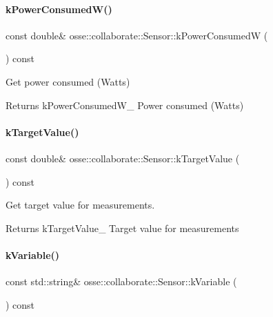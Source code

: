 \paragraph{\texorpdfstring{k\+Power\+Consumed\+W()}{kPowerConsumedW()}}
{\footnotesize\ttfamily const double\& osse\+::collaborate\+::\+Sensor\+::k\+Power\+ConsumedW (\begin{DoxyParamCaption}{ }\end{DoxyParamCaption}) const\hspace{0.3cm}{\ttfamily [inline]}}



Get power consumed (Watts) 

\begin{DoxyReturn}{Returns}
k\+Power\+Consumed\+W\+\_\+ Power consumed (Watts) 
\end{DoxyReturn}
\mbox{\label{classosse_1_1collaborate_1_1_sensor_ae19c635fce562849ee3d1e7883bee22c}} 
\paragraph{\texorpdfstring{k\+Target\+Value()}{kTargetValue()}}
{\footnotesize\ttfamily const double\& osse\+::collaborate\+::\+Sensor\+::k\+Target\+Value (\begin{DoxyParamCaption}{ }\end{DoxyParamCaption}) const\hspace{0.3cm}{\ttfamily [inline]}}



Get target value for measurements. 

\begin{DoxyReturn}{Returns}
k\+Target\+Value\+\_\+ Target value for measurements 
\end{DoxyReturn}
\mbox{\label{classosse_1_1collaborate_1_1_sensor_a06cf8b42c998b5125fcaef972f1950fd}} 
\paragraph{\texorpdfstring{k\+Variable()}{kVariable()}}
{\footnotesize\ttfamily const std\+::string\& osse\+::collaborate\+::\+Sensor\+::k\+Variable (\begin{DoxyParamCaption}{ }\end{DoxyParamCaption}) const\hspace{0.3cm}{\ttfamily [inline]}}



